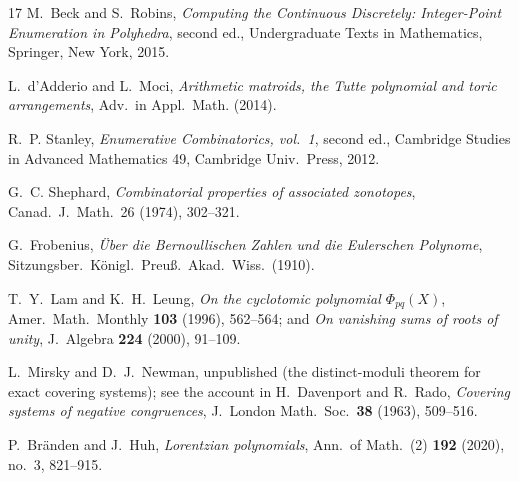 \begin{thebibliography}{17}
M.~Beck and S.~Robins,
\emph{Computing the Continuous Discretely: Integer-Point Enumeration
in Polyhedra}, second ed.,
Undergraduate Texts in Mathematics, Springer, New York, 2015.

L.~d'Adderio and L.~Moci,
\emph{Arithmetic matroids, the Tutte polynomial and toric
arrangements},
Adv.\ in Appl.\ Math. (2014).

R.~P. Stanley,
\emph{Enumerative Combinatorics, vol.~1}, second ed.,
Cambridge Studies in Advanced Mathematics 49, Cambridge Univ.\ Press,
2012.

G.~C. Shephard,
\emph{Combinatorial properties of associated zonotopes},
Canad.\ J.\ Math.\ 26 (1974), 302--321.

G.~Frobenius,
\emph{\"Uber die Bernoullischen Zahlen und die Eulerschen Polynome},
Sitzungsber.\ K\"onigl.\ Preu\ss.\ Akad.\ Wiss.\ (1910).

T.~Y.~Lam and K.~H.~Leung,
\emph{On the cyclotomic polynomial $\Phi_{pq}(X)$},
Amer.\ Math.\ Monthly \textbf{103} (1996), 562--564; and
\emph{On vanishing sums of roots of unity},
J.\ Algebra \textbf{224} (2000), 91--109.

L.~Mirsky and D.~J.~Newman,
unpublished (the distinct-moduli theorem for exact covering systems);
see the account in
H.~Davenport and R.~Rado,
\emph{Covering systems of negative congruences},
J.\ London Math.\ Soc.\ \textbf{38} (1963), 509--516.

P.~Br\"anden and J.~Huh,
\emph{Lorentzian polynomials},
Ann.\ of Math.\ (2) \textbf{192} (2020), no.~3, 821--915.

\end{thebibliography}
\endgroup
